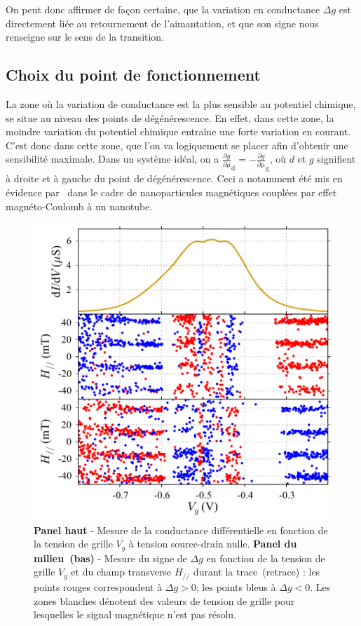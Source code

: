 On peut donc affirmer de façon certaine, que la variation en conductance $\Delta g$ est directement liée au retournement de l'aimantation, et que son signe nous renseigne sur le sens de la transition.


\subsection{Choix du point de fonctionnement}
La zone où la variation de conductance est la plus sensible au potentiel chimique, se situe au niveau des points de dégénérescence. En effet, dans cette zone, la moindre variation du potentiel chimique entraîne une forte variation en courant. C'est donc dans cette zone, que l'on va logiquement se placer afin d'obtenir une sensibilité maximale. Dans un système idéal, on a $\frac{\partial g}{\partial \mu}_{\text{d}} = -\frac{\partial g}{\partial \mu}_{\text{g}}$, où $d$ et $g$ signifient à droite et à gauche du point de dégénérescence. Ceci a notamment été mis en évidence par~\cite{Datta2011} dans le cadre de nanoparticules magnétiques couplées par effet magnéto-Coulomb à un nanotube.

\begin{figure}
\parbox{7cm}{
\includegraphics[scale=0.45]{Resultats/PointFonct/PointFonct.pdf} 
}
\parbox{6.5cm}{\caption{\textbf{Panel haut} - Mesure de la conductance différentielle en fonction de la tension de grille $V_g$ à tension source-drain nulle. \textbf{Panel du milieu~(bas)} - Mesure du signe de $\Delta g$ en fonction de la tension de grille $V_g$ et du champ transverse $H_{//}$ durant la trace~(retrace) : les points rouges correspondent à $\Delta g >0$; les points bleus à $\Delta g <0$. Les zones blanches dénotent des valeurs de tension de grille pour lesquelles le signal magnétique n'est pas résolu.}
\label{point_fonctio}
}
\end{figure}

